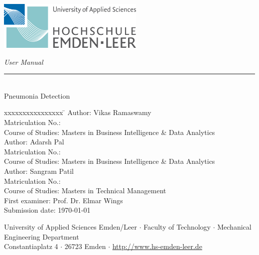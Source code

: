 %
%
%

\begin{titlepage}
	
	\begin{flushleft} 
		\includegraphics[width=7cm]{General/Logo.png}
	\end{flushleft} 
	
	\begin{flushright}
		\vspace{2cm}
		\LARGE \textsl{User Manual}\\
		\rule{0.6\textwidth}{0.4pt} ~\\
		\vspace{0.5cm}
		\textsf{\LARGE Pneumonia Detection}\\
	\end{flushright}
	
	\vspace{1.5cm}
	\begin{tabbing}
		xxxxxxxxxxxxxxxx \= \kill
		Author: \> Vikas Ramaswamy \\
		Matriculation No.:  \\
	    Course of Studies: \> Masters in Business Intelligence \& Data Analytics \\ [0.2cm]
	    
		Author: \> Adarsh Pal \\
		Matriculation No.:  \\
    	Course of Studies: \> Masters in Business Intelligence \& Data Analytics \\ [0.2cm]
    	
		Author: \> Sangram Patil \\
		Matriculation No.:  \\
		Course of Studies: \> Masters in Technical Management  \\ [0.5cm]
		First examiner: \> Prof. Dr. Elmar Wings \\
		Submission date: \> \today \\
	\end{tabbing}
	
	\vspace{3cm}
	\small
	\begin{center}
		University of Applied Sciences Emden/Leer $\cdot$ 
		Faculty of Technology $\cdot$ 
		Mechanical Engineering Department \\
		Constantiaplatz 4 $\cdot$ 
		26723 Emden $\cdot$ 
		\url{http://www.hs-emden-leer.de}
	\end{center}
	
\end{titlepage}
